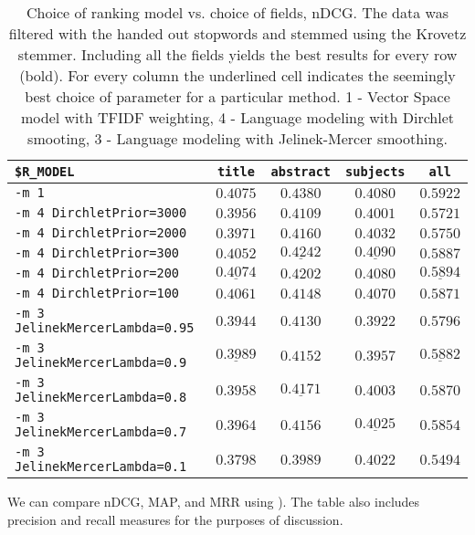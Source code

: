 \begin{table}[h!]
\centering
\begin{tabular}{lcccc}
\lstinline|$R_MODEL| & \lstinline$title$ & \lstinline$abstract$ &
    \lstinline$subjects$ & \lstinline$all$ \\
\hline
\lstinline$-m 1$ & $0.4075$ & $0.4380$ & $0.4080$ & $\mathbf{0.5922}$ \\
\hline
\lstinline$-m 4 DirchletPrior=3000$ & $0.3956$ & $0.4109$ & $0.4001$ & $\mathbf{0.5721}$ \\
\lstinline$-m 4 DirchletPrior=2000$ & $0.3971$ & $0.4160$ & $0.4032$ & $\mathbf{0.5750}$ \\
\lstinline$-m 4 DirchletPrior=300$ & $0.4052$ & $\underline{0.4242}$ & $\underline{0.4090}$ & $\mathbf{0.5887}$ \\
\lstinline$-m 4 DirchletPrior=200$ & $\underline{0.4074}$ & $0.4202$ & $0.4080$ & $\underline{\mathbf{0.5894}}$ \\
\lstinline$-m 4 DirchletPrior=100$ & $0.4061$ & $0.4148$ & $0.4070$ & $\mathbf{0.5871}$ \\
\hline
\lstinline$-m 3 JelinekMercerLambda=0.95$ & $0.3944$ & $0.4130$ & $0.3922$ & $\mathbf{0.5796}$ \\
\lstinline$-m 3 JelinekMercerLambda=0.9$ & $\underline{0.3989}$ & $0.4152$ & $0.3957$ &
    $\underline{\mathbf{0.5882}}$ \\
\lstinline$-m 3 JelinekMercerLambda=0.8$ & $0.3958$ & $\underline{0.4171}$ & $0.4003$ & $\mathbf{0.5870}$ \\
\lstinline$-m 3 JelinekMercerLambda=0.7$ & $0.3964$ & $0.4156$ & $\underline{0.4025}$ & $\mathbf{0.5854}$ \\
\lstinline$-m 3 JelinekMercerLambda=0.1$ & $0.3798$ & $0.3989$ & $0.4022$ & $\mathbf{0.5494}$ \\
\hline
\end{tabular}
\caption[]{Choice of ranking model vs. choice of fields, nDCG. The data was
filtered with the handed out stopwords and stemmed using the Krovetz stemmer.
Including all the fields yields the best results for every row (bold).  For
every column the underlined cell indicates the seemingly best choice of
parameter for a particular method. 1 - Vector Space model with TFIDF weighting,
4 - Language modeling with Dirchlet smooting, 3 - Language modeling with
Jelinek-Mercer smoothing.}
\label{table:ranking-model-vs-fields}
\end{table}


We can compare nDCG, MAP, and MRR using
).  The table also includes
precision and recall measures for the purposes of discussion.

